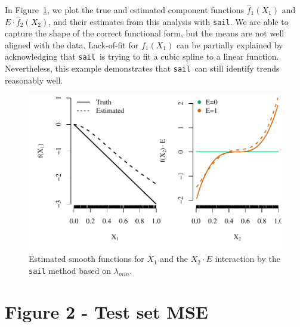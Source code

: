 \documentclass[12pt,letter]{article}\usepackage[]{graphicx}\usepackage[]{color}
\newenvironment{knitrout}{}{} %
\newcommand{\sail}{\texttt{sail}}
\begin{document}
In Figure~\ref{fig:toy-effects}, we plot the true and estimated component functions $\hat{f}_1(X_1)$ and $E \cdot \hat{f}_2(X_2)$, and their estimates from this analysis with \texttt{sail}.
We are able to capture the shape of the correct functional form, but the means are not well aligned with the data. Lack-of-fit for $f_1(X_1)$ can be partially explained by acknowledging that \sail ~is trying to fit a cubic spline to a linear function.
Nevertheless, this example demonstrates that \sail ~can still identify trends reasonably well.

\begin{knitrout}\scriptsize
{}\color{fgcolor}\begin{figure}[H]

{\centering \includegraphics[width=1\linewidth]{figure/toy-effects-1} 

}

\caption[Estimated smooth functions for $X_1$ and the $X_2 \cdot E$ interaction by the \texttt{sail} method based on $\lambda_{min}$]{Estimated smooth functions for $X_1$ and the $X_2 \cdot E$ interaction by the \texttt{sail} method based on $\lambda_{min}$.}\label{fig:toy-effects}
\end{figure}

\end{knitrout}



\section{Figure 2 - Test set MSE}
\end{document}
